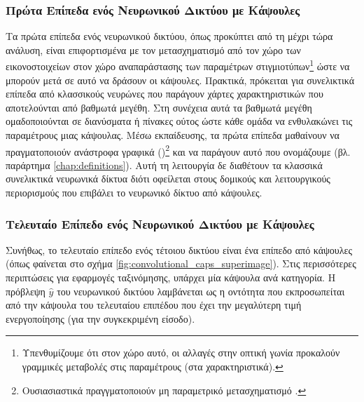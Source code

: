 \subsubsection{Πρώτα Επίπεδα ενός Νευρωνικού Δικτύου με Κάψουλες}
Τα πρώτα επίπεδα ενός νευρωνικού δικτύου, όπως προκύπτει από τη μέχρι τώρα ανάλυση, είναι επιφορτισμένα με τον μετασχηματισμό από τον χώρο των εικονοστοιχείων στον χώρο αναπαράστασης των παραμέτρων στιγμιοτύπων\footnote{Υπενθυμίζουμε ότι στον χώρο αυτό, οι αλλαγές στην οπτική γωνία προκαλούν γραμμικές μεταβολές στις παραμέτρους (στα χαρακτηριστικά).} ώστε να μπορούν μετά σε αυτό να δράσουν οι κάψουλες. Πρακτικά, πρόκειται για συνελικτικά επίπεδα από κλασσικούς νευρώνες που παράγουν χάρτες χαρακτηριστικών που αποτελούνται από βαθμωτά μεγέθη. Στη συνέχεια αυτά τα βαθμωτά μεγέθη ομαδοποιούνται σε διανύσματα ή πίνακες ούτος ώστε κάθε ομάδα να ενθυλακώνει τις παραμέτρους μιας κάψουλας. Μέσω εκπαίδευσης, τα πρώτα επίπεδα μαθαίνουν να πραγματοποιούν ανάστροφα γραφικά ()\footnote{Ουσιασιαστικά πραγγματοποιούν μη παραμετρικό μετασχηματισμό .} και να παράγουν αυτό που ονομάζουμε  (βλ. παράρτημα \ref{chap:definitions}). Αυτή τη λειτουργία δε διαθέτουν τα κλασσικά συνελικτικά νευρωνικά δίκτυα διότι οφείλεται στους δομικούς και λειτουργικούς περιορισμούς που επιβάλει το νευρωνικό δίκτυο από κάψουλες.\par

\subsubsection{Τελευταίο Επίπεδο ενός Νευρωνικού Δικτύου με Κάψουλες}
Συνήθως, το τελευταίο επίπεδο ενός τέτοιου δικτύου είναι ένα επίπεδο από κάψουλες (όπως φαίνεται στο σχήμα \ref{fig:convolutional_caps_superimage}). Στις περισσότερες περιπτώσεις για εφαρμογές ταξινόμησης, υπάρχει μία κάψουλα ανά κατηγορία. Η πρόβλεψη $\hat{y}$ του νευρωνικού δικτύου λαμβάνεται ως η οντότητα που εκπροσωπείται από την κάψουλα του τελευταίου επιπέδου που έχει την μεγαλύτερη τιμή ενεργοποίησης (για την συγκεκριμένη είσοδο).

